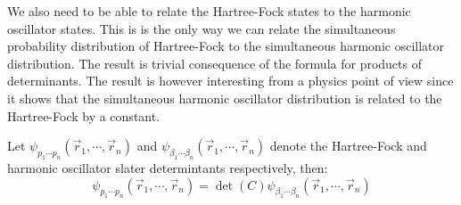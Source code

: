 \documentclass[11pt,english,a4paper]{article}
\begin{document}
We also need to be able to relate the Hartree-Fock states to the harmonic oscillator states. This is is the only way we can relate the simultaneous probability distribution of Hartree-Fock to the simultaneous harmonic oscillator distribution. The result is trivial consequence of the formula for products of determinants. The result is however interesting from a physics point of view since it shows that the simultaneous harmonic oscillator distribution is related to the Hartree-Fock by a constant.
\begin{prop}
Let $\psi_{  p_1\cdots p_n}(\vec{r}_1,\cdots, \vec{r}_n)$ and $\psi_{  \beta_1\cdots \beta_n}(\vec{r}_1,\cdots, \vec{r}_n)$ denote the Hartree-Fock and harmonic oscillator slater determintants respectively, then:
\[
\psi_{  p_1\cdots p_n}(\vec{r}_1,\cdots, \vec{r}_n) = \det (C) \psi_{  \beta_1\cdots \beta_n}(\vec{r}_1,\cdots, \vec{r}_n) 
\] \label{prop:slater}
\end{prop}
\end{document}
